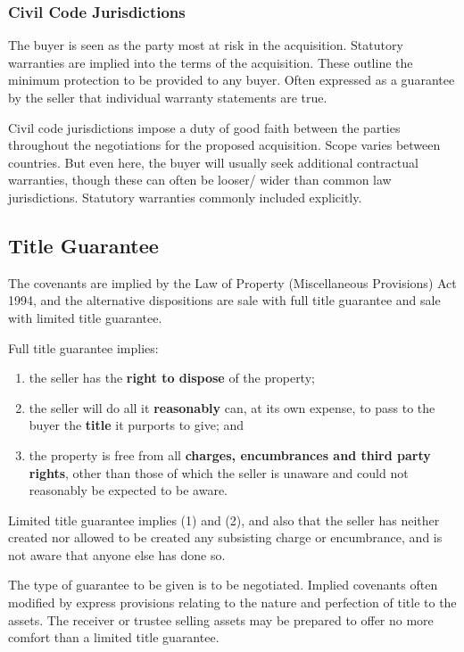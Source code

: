 \documentclass[
]{article}
\providecommand{\tightlist}{%
  \setlength{\itemsep}{0pt}\setlength{\parskip}{0pt}}
\begin{document}
\hypertarget{civil-code-jurisdictions}{%
\subsubsection{Civil Code
Jurisdictions}\label{civil-code-jurisdictions}}

The buyer is seen as the party most at risk in the acquisition.
Statutory warranties are implied into the terms of the acquisition.
These outline the minimum protection to be provided to any buyer. Often
expressed as a guarantee by the seller that individual warranty
statements are true.

Civil code jurisdictions impose a duty of good faith between the parties
throughout the negotiations for the proposed acquisition. Scope varies
between countries. But even here, the buyer will usually seek additional
contractual warranties, though these can often be looser/ wider than
common law jurisdictions. Statutory warranties commonly included
explicitly.

\hypertarget{title-guarantee}{%
\subsection{Title Guarantee}\label{title-guarantee}}

The covenants are implied by the Law of Property (Miscellaneous
Provisions) Act 1994, and the alternative dispositions are sale with
full title guarantee and sale with limited title guarantee.

Full title guarantee implies:

\begin{enumerate}
\tightlist
\item
  the seller has the \textbf{right to dispose} of the property;
\item
  the seller will do all it \textbf{reasonably} can, at its own expense,
  to pass to the buyer the \textbf{title} it purports to give; and
\item
  the property is free from all \textbf{charges, encumbrances and third
  party rights}, other than those of which the seller is unaware and
  could not reasonably be expected to be aware.
\end{enumerate}

Limited title guarantee implies (1) and (2), and also that the seller
has neither created nor allowed to be created any subsisting charge or
encumbrance, and is not aware that anyone else has done so.

The type of guarantee to be given is to be negotiated. Implied covenants
often modified by express provisions relating to the nature and
perfection of title to the assets. The receiver or trustee selling
assets may be prepared to offer no more comfort than a limited title
guarantee.
\end{document}
